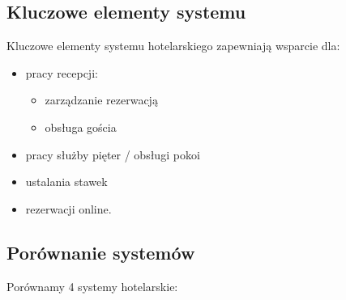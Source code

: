 \documentclass[a4paper,onecolumn,oneside,11pt,wide,floatssmall]{mwrep}
\theoremstyle{definition}
\theoremstyle{plain}%
\theoremstyle{remark}
\begin{document}
\subsection{Kluczowe elementy systemu}

Kluczowe elementy systemu hotelarskiego zapewniają wsparcie dla:
\begin{itemize} 
  \item pracy recepcji:
    \begin{itemize}
      \item zarządzanie rezerwacją
      \item obsługa gościa
    \end{itemize}
  \item pracy służby pięter / obsługi pokoi
  \item ustalania stawek
  \item rezerwacji online.
\end{itemize}






\subsection{Porównanie systemów}
Porównamy 4 systemy hotelarskie:
\end{document}
